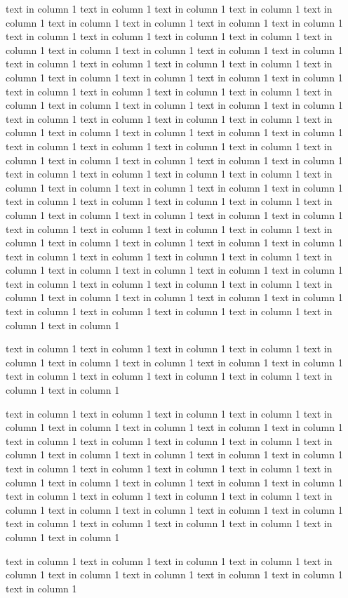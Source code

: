 \documentclass{article}
\begin{document}
 text in column 1  text in column 1  text in column 1  text in column 1  text in column 1  text in column 1  text in column 1  text in column 1  text in column 1  text in column 1  text in column 1  text in column 1  text in column 1  text in column 1  text in column 1  text in column 1  text in column 1  text in column 1  text in column 1  text in column 1  text in column 1  text in column 1  text in column 1  text in column 1  text in column 1  text in column 1  text in column 1  text in column 1  text in column 1  text in column 1  text in column 1  text in column 1  text in column 1  text in column 1  text in column 1  text in column 1  text in column 1  text in column 1  text in column 1  text in column 1  text in column 1  text in column 1  text in column 1  text in column 1  text in column 1  text in column 1  text in column 1  text in column 1  text in column 1  text in column 1  text in column 1  text in column 1  text in column 1  text in column 1  text in column 1  text in column 1  text in column 1  text in column 1  text in column 1  text in column 1  text in column 1  text in column 1  text in column 1  text in column 1  text in column 1  text in column 1  text in column 1  text in column 1  text in column 1  text in column 1  text in column 1  text in column 1  text in column 1  text in column 1  text in column 1  text in column 1  text in column 1  text in column 1  text in column 1  text in column 1  text in column 1  text in column 1  text in column 1  text in column 1  text in column 1  text in column 1  text in column 1  text in column 1  text in column 1  text in column 1  text in column 1  text in column 1  text in column 1  text in column 1  text in column 1  text in column 1  text in column 1  text in column 1  text in column 1  text in column 1  text in column 1  text in column 1  text in column 1  text in column 1  text in column 1

 text in column 1  text in column 1  text in column 1  text in column 1  text in column 1  text in column 1  text in column 1  text in column 1  text in column 1  text in column 1  text in column 1  text in column 1  text in column 1  text in column 1  text in column 1

 text in column 1  text in column 1  text in column 1  text in column 1  text in column 1  text in column 1  text in column 1  text in column 1  text in column 1  text in column 1  text in column 1  text in column 1  text in column 1  text in column 1  text in column 1  text in column 1  text in column 1  text in column 1  text in column 1  text in column 1  text in column 1  text in column 1  text in column 1  text in column 1  text in column 1  text in column 1  text in column 1  text in column 1  text in column 1  text in column 1  text in column 1  text in column 1  text in column 1  text in column 1  text in column 1  text in column 1  text in column 1  text in column 1  text in column 1  text in column 1  text in column 1  text in column 1

 text in column 1  text in column 1  text in column 1  text in column 1  text in column 1  text in column 1  text in column 1  text in column 1  text in column 1  text in column 1





\end{document}
